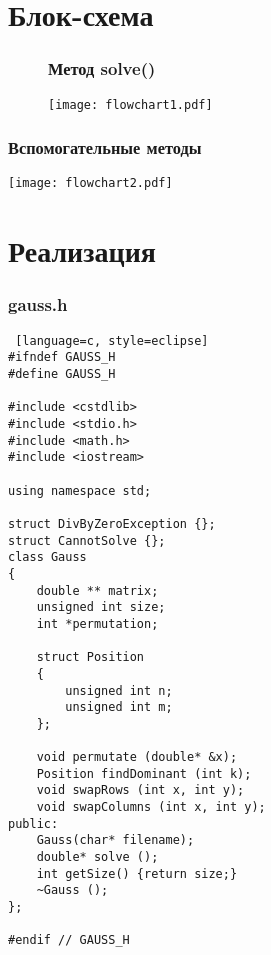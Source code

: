 \documentclass[a4paper,11pt]{article}
\begin{document}
\part{Блок-схема} 
\begin{figure}[h!]
\section*{Метод solve()}
\texttt{[image: flowchart1.pdf]}
\end{figure}
\newpage
\section*{Вспомогательные методы}
\texttt{[image: flowchart2.pdf]}
 


\newpage
\part{Реализация}
\section*{gauss.h}
\begin{lstlisting} [language=c, style=eclipse]
#ifndef GAUSS_H
#define GAUSS_H

#include <cstdlib>
#include <stdio.h>
#include <math.h>
#include <iostream>

using namespace std;

struct DivByZeroException {};
struct CannotSolve {};
class Gauss
{
    double ** matrix;
    unsigned int size;
    int *permutation;

    struct Position
    {
        unsigned int n;
        unsigned int m;
    };

    void permutate (double* &x);
    Position findDominant (int k);
    void swapRows (int x, int y);
    void swapColumns (int x, int y);
public:
    Gauss(char* filename);
    double* solve ();
    int getSize() {return size;}
    ~Gauss ();
};

#endif // GAUSS_H

\end{lstlisting}
\newpage
\end{document}
